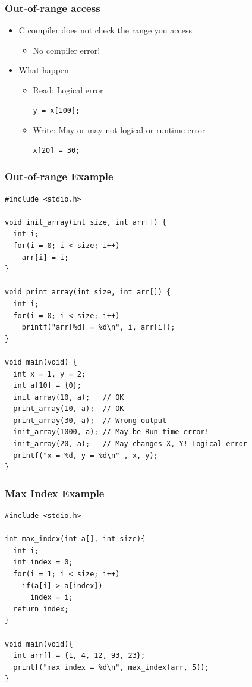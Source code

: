 \documentclass{../c-lecture}
\begin{document}
\begin{frame}[fragile]
  \frametitle{Out-of-range access}
  \begin{itemize}
    \item C compiler does not check the range you access
    \begin{itemize}
      \begin{verbatim}
int x[10]; x[20] = 30; y = x[100];
      \end{verbatim}
      \item No compiler error!
    \end{itemize}
    \item What happen
    \begin{itemize}
      \item Read: Logical error
      \begin{verbatim}
y = x[100];
      \end{verbatim}
      \item Write: May or may not logical or runtime error
      \begin{verbatim}
x[20] = 30;
      \end{verbatim}
    \end{itemize}
  \end{itemize}
\end{frame}

\begin{frame}[fragile]
  \frametitle{Out-of-range Example}
  \scriptsize
  \begin{verbatim}
#include <stdio.h>

void init_array(int size, int arr[]) {
  int i;
  for(i = 0; i < size; i++)
    arr[i] = i;
}

void print_array(int size, int arr[]) {
  int i;
  for(i = 0; i < size; i++)
    printf("arr[%d] = %d\n", i, arr[i]);
}

void main(void) {
  int x = 1, y = 2;
  int a[10] = {0};
  init_array(10, a);   // OK
  print_array(10, a);  // OK
  print_array(30, a);  // Wrong output
  init_array(1000, a); // May be Run-time error!
  init_array(20, a);   // May changes X, Y! Logical error
  printf("x = %d, y = %d\n" , x, y);
}
  \end{verbatim}
\end{frame}

\begin{frame}[fragile]
  \frametitle{Max Index Example}
  \scriptsize
  \begin{verbatim}
#include <stdio.h>

int max_index(int a[], int size){
  int i;
  int index = 0;
  for(i = 1; i < size; i++)
    if(a[i] > a[index])
      index = i;
  return index;
}

void main(void){
  int arr[] = {1, 4, 12, 93, 23};
  printf("max index = %d\n", max_index(arr, 5));
}
  \end{verbatim}
\end{frame}
\end{document}

